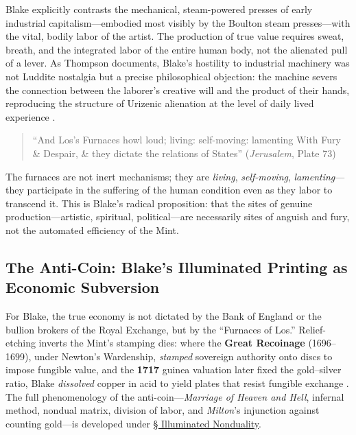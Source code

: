 \documentclass[
]{article}
\begin{document}
Blake explicitly contrasts the mechanical, steam-powered presses of
early industrial capitalism---embodied most visibly by the Boulton steam
presses---with the vital, bodily labor of the artist. The production of
true value requires sweat, breath, and the integrated labor of the
entire human body, not the alienated pull of a lever. As Thompson
documents, Blake's hostility to industrial machinery was not Luddite
nostalgia but a precise philosophical objection: the machine severs the
connection between the laborer's creative will and the product of their
hands, reproducing the structure of Urizenic alienation at the level of
daily lived experience \citep{thompson1993witness}.

\begin{quote}
``And Los's Furnaces howl loud; living: self-moving: lamenting With Fury
\& Despair, \& they dictate the relations of States'' (\emph{Jerusalem},
Plate 73) \citep{erdman1988complete}
\end{quote}

The furnaces are not inert mechanisms; they are \emph{living},
\emph{self-moving}, \emph{lamenting}---they participate in the suffering
of the human condition even as they labor to transcend it. This is
Blake's radical proposition: that the sites of genuine
production---artistic, spiritual, political---are necessarily sites of
anguish and fury, not the automated efficiency of the Mint.

\subsection{The Anti-Coin: Blake's Illuminated Printing as Economic
Subversion}\label{the-anti-coin-blakes-illuminated-printing-as-economic-subversion}

For Blake, the true economy is not dictated by the Bank of England or
the bullion brokers of the Royal Exchange, but by the ``Furnaces of
Los.'' Relief-etching inverts the Mint's stamping dies: where the
\textbf{Great Recoinage} (1696--1699), under Newton's Wardenship,
\emph{stamped} sovereign authority onto discs to impose fungible value,
and the \textbf{1717} guinea valuation later fixed the gold--silver
ratio, Blake \emph{dissolved} copper in acid to yield plates that resist
fungible exchange \citep{poovey2008genres}. The full phenomenology of
the anti-coin---\emph{Marriage of Heaven and Hell}, infernal method,
nondual matrix, division of labor, and \emph{Milton}'s injunction
against counting gold---is developed under
\hyperref[sec-illuminated-nonduality]{§ Illuminated Nonduality}.
\end{document}
